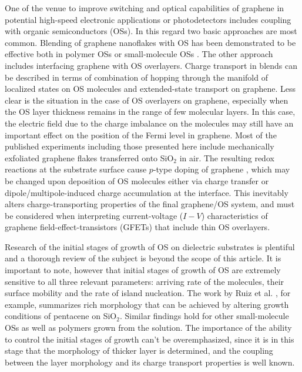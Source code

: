 \documentclass[review]{elsarticle}
\begin{document}
One of the venue to improve switching and optical capabilities of graphene in potential high-speed electronic applications\cite{novoselov-2004} or photodetectors includes coupling with organic semiconductors (OSs).
 In this regard  two basic approaches are most common.
 Blending of graphene nanoflakes with OS  has been demonstrated to be effective both in polymer OSs\cite{pathipati-2015,elgemayel-2014,liscio-2011} or small-molecule OSs \cite{pathipati-2014}.
 The other approach includes interfacing graphene with OS overlayers\cite{pathipati-2019,pathipati-2015,huisman-2015,kim-2017b,ha-2012,zhou-2013a,nouchi-2008,nouchi-2014}.
 Charge transport in blends can be described in terms of combination of hopping through the manifold of localized states on OS molecules and extended-state transport on graphene.
 Less clear is the situation in the case of OS overlayers on graphene, especially when the OS layer thickness remains in the range of few molecular layers.
 In this case, the electric field due to the charge imbalance on the molecules may still have an important effect on the position of the Fermi level in graphene.
 Most of the published experiments including those presented here include mechanically exfoliated graphene flakes transferred onto SiO$_{2}$ in air.
 The resulting redox reactions at the substrate surface cause $p$-type doping of graphene \cite{feng-2014,peng-2017,lafkioti-2010}, which may be changed upon deposition of OS molecules either via charge transfer or dipole/multipole-induced charge accumulation at the interface.
 This inevitably alters charge-transporting properties of the final graphene/OS system, and must be considered when interpreting current-voltage ($I-V$) characteristics of graphene field-effect-transistors (GFETs) that include thin OS overlayers.
 

Research of the initial stages of growth of OS on dielectric substrates is plentiful and a thorough review of the subject is beyond the scope of this article.
 It is important to note, however that initial stages of growth of OS are extremely sensitive to all three relevant parameters: arriving rate of the molecules, their surface mobility and the rate of island nucleation.
 The work by Ruiz et al.
 \cite{ruiz-2004}, for example, summarizes rich morphology that can be achieved by altering growth conditions of pentacene on SiO$_{2}$. Similar findings hold for other small-molecule OSs as well as polymers grown from the solution.
 The importance of the ability to control the initial stages of growth can't be overemphasized, since it is in this stage that the morphology of thicker layer is determined, and the coupling between the layer morphology and its charge transport properties is well known.
\end{document}
